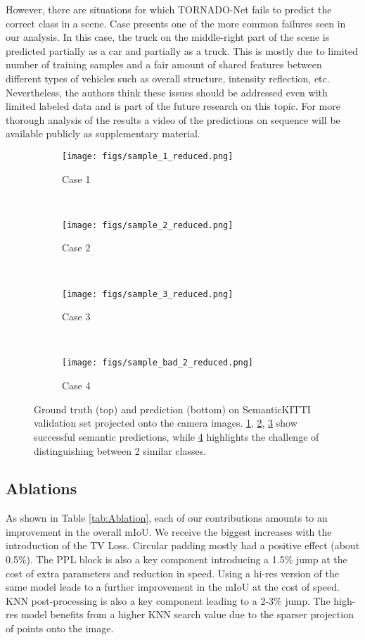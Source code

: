 \documentclass{article}
\begin{document}
However, there are situations for which TORNADO-Net fails to predict the correct class in a scene. Case  presents one of the more common failures seen in our analysis. In this case, the truck on the middle-right part of the scene is predicted partially as a car and partially as a truck. This is mostly due to limited number of training samples and a fair amount of shared features between different types of vehicles such as overall structure, intensity reflection, etc. Nevertheless, the authors think these issues should be addressed even with limited labeled data and is part of the future research on this topic. For more thorough analysis of the results a video of the predictions on sequence  will be available publicly as supplementary material.
 



\begin{figure} [!htbp]
	\centering
	\begin{subfigure}[t]{0.38\textwidth}
		\texttt{[image: figs/sample\_1\_reduced.png]}
		\caption{Case 1}
		\label{fig:case 1}
	\end{subfigure}
	~ \begin{subfigure}[t]{0.38\textwidth}
		\texttt{[image: figs/sample\_2\_reduced.png]}
		\caption{Case 2}
		\label{fig:case 2}
	\end{subfigure}
	~ \begin{subfigure}[t]{0.38\textwidth}
		\texttt{[image: figs/sample\_3\_reduced.png]}
		\caption{Case 3}
		\label{fig:case 3}
	\end{subfigure}
	~
	\begin{subfigure}[t]{0.38\textwidth}
		\texttt{[image: figs/sample\_bad\_2\_reduced.png]}
		\caption{Case 4}
		\label{fig:case 4}
	\end{subfigure}
	\caption{Ground truth (top) and prediction (bottom) on SemanticKITTI validation set projected onto the camera images. \ref{fig:case 1}, \ref{fig:case 2}, \ref{fig:case 3} show successful semantic predictions, while \ref{fig:case 4} highlights the challenge of distinguishing between 2 similar classes.}
	\label{fig:Qualitative}
\end{figure}

\subsection{Ablations}
    As shown in Table \ref{tab:Ablation}, each of our contributions amounts to an improvement in the overall mIoU. We receive the biggest increases with the introduction of the TV Loss. Circular padding mostly had a positive effect (about 0.5\%). The PPL block is also a key component introducing a 1.5\% jump at the cost of extra parameters and reduction in speed. Using a hi-res version of the same model leads to a further improvement in the mIoU at the cost of speed. KNN post-processing is also a key component leading to a 2-3\% jump. The high-res model benefits from a higher KNN search value due to the sparser projection of points onto the image. 
\end{document}
